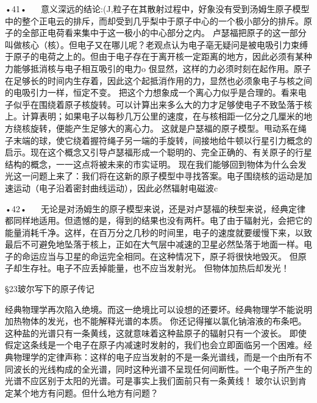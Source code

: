 •41•
  
意义深远的结论:(J,粒子在其散射过程中，好象没有受到汤姆生原子模型中的整个正电云的排斥，而却受到几乎梨中于原子中心的一个极小部分的排斥。原子的全部正电荷看来集中于这一极小的中心部分之内。
卢瑟福把原子的这一部分叫做核心（核）。但电子又在哪儿呢？老观点认为电子亳无疑问是被电吸引力束缚于原子的电荷之上的。但由于电子存在于离开核一定距离的地方，因此必须有某种力能够抵消核与电子相互吸引的电力o
佷显然，这样的力必须时刻在起作用。原子在足够长的时间内生存着，因此这个起抵消作用的力，显然也必须象电子与核之间的电吸引力一样，恒定不变。
把这个力想象成一个离心力似乎是合理的。看来电子似乎在围绕着原子核旋转。可以计算出来多么大的力才足够使电子不致坠落于核上。计算表明；如果电子以每秒几万公里的速度，在与核相距一亿分之几厘米的地方绕核旋转，便能产生足够大的离心力。
这就是户瑟福的原子模型。甩动系在绳子末端的球，使它绕着握符绳子另一端的手旋转，间接地给牛顿以行星引力概念的启示。现在这个概念又引导卢瑟福形成一个聪明的、完全正确的、有关原子的行星结构的概念，一一这点将被未来的市实证明。
现在我们能够回到物体为什么会发光这一问题上来了：我们将在这新的原子模型中寻找答案。电子围绕核的运动是加速运动（电子沿着密封曲线运动），因此必然辐射电磁波c

•42•
  
无论是对汤姆生的原子模型来说，还是对卢瑟福的秧型来说，经典定律都同样地适用。但遗憾的是，得到的结果也没有两杆。电了由于辐射光，会把它的能量消耗千净。这样，在百万分之几秒的时间里，电子的速度就要缓慢下来，以致最后不可避免地坠落于核上，正如在大气层中减速的卫星必然坠落于地面一样。电子的命运应当与卫星的命运完全相同。在这种情况下，原子将很快地毁灭。
但原子却生存社。电子不应丢掉能量，也不应当发射光。
但物体加热后却发光！

§23玻尔写下的原子传记

经典物理学再次陷入绝境。而这一绝境比可以设想的还要坏。经典物理学不能说明加热物体的发光，也不能解释光谱的本质。
你还记得摧以氯化钠溶液的布条吧。这种盐的光谱只有一条黄线，这就意味着这种盐原子的辐射只有一个波长。
即使假定这条线是一个电子在原子内减速时发射的，我们也会立即面临另一个困难。经典物理学的定律声称：这样的电子应当发射的不是一条光谱线，而是一个由所有不同波长的光线构成的全光谱，同时这种光谱不呈现任何间断性。一个电子所产生的光谱不应区别于太阳的光谱。可是事实上我们面前只有一条黄线！
玻尔认识到肯定某个地方有问题。但什么地方有问题？

